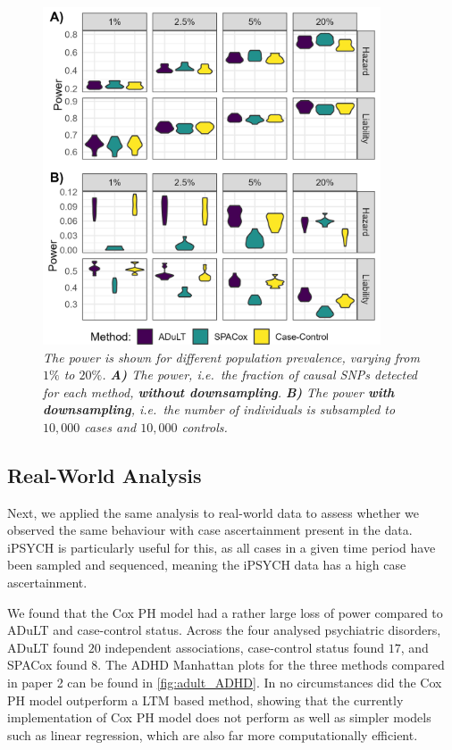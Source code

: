\begin{figure}[h]
	\centering
	\includegraphics[width=10cm]{results/adult_combined_C250_power}
	\caption[Power simulation results with $ 250 $ causal SNPs under both generative models and varying prevalences.]{\sl The power is shown for different population prevalence, varying from $ 1\% $ to $ 20\% $. \textbf{A)} The power, i.e.\ the fraction of causal SNPs detected for each method, \textbf{without downsampling}. \textbf{B)} The power \textbf{with downsampling}, i.e.\ the number of individuals is subsampled to $ 10,000 $ cases and $ 10,000 $ controls.}
	\label{fig:adult_simulations}
\end{figure}


\subsection{Real-World Analysis}
Next, we applied the same analysis to real-world data to assess whether we observed the same behaviour with case ascertainment present in the data. iPSYCH is particularly useful for this, as all cases in a given time period have been sampled and sequenced, meaning the iPSYCH data has a high case ascertainment.

We found that the Cox PH model had a rather large loss of power compared to ADuLT and case-control status. Across the four analysed psychiatric disorders, ADuLT found $ 20 $ independent associations, case-control status found $ 17 $, and SPACox found $ 8 $. The ADHD Manhattan plots for the three methods compared in paper 2 can be found in \cref{fig:adult_ADHD}. In no circumstances did the Cox PH model outperform a LTM based method, showing that the currently implementation of Cox PH model does not perform as well as simpler models such as linear regression, which are also far more computationally efficient.

